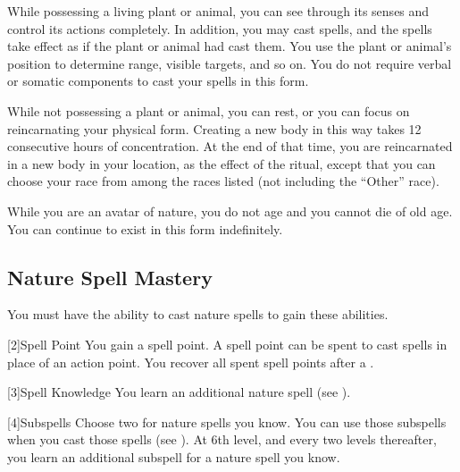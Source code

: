             While possessing a living plant or animal, you can see through its senses and control its actions completely.
            In addition, you may cast spells, and the spells take effect as if the plant or animal had cast them.
            You use the plant or animal's position to determine range, visible targets, and so on.
            You do not require verbal or somatic components to cast your spells in this form.

            While not possessing a plant or animal, you can rest, or you can focus on reincarnating your physical form.
            Creating a new body in this way takes 12 consecutive hours of concentration.
            At the end of that time, you are reincarnated in a new body in your location, as the effect of the  ritual, except that you can choose your race from among the races listed (not including the ``Other'' race).

            While you are an avatar of nature, you do not age and you cannot die of old age.
            You can continue to exist in this form indefinitely.

        \subsection{Nature Spell Mastery}
            You must have the ability to cast nature spells to gain these abilities.

            [2]{Spell Point}
            You gain a spell point.
            A spell point can be spent to cast spells in place of an action point.
            You recover all spent spell points after a .

            [3]{Spell Knowledge} 
            You learn an additional nature spell (see ).

            [4]{Subspells}
            Choose two  for nature spells you know.
            You can use those subspells when you cast those spells (see ).
            At 6th level, and every two levels thereafter, you learn an additional subspell for a nature spell you know.

